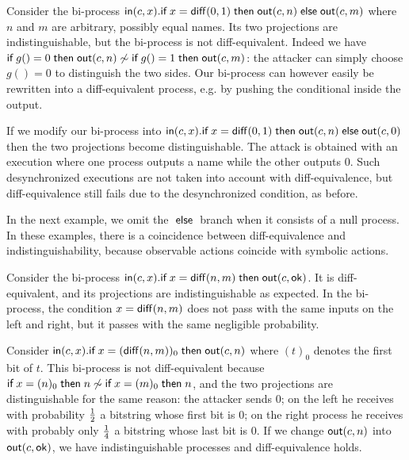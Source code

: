 \begin{example}
  Consider the bi-process
  $\mathsf{in}(c,x).\textsf{if}\; x=\mathsf{diff}(0,1) \;\textsf{then}\; \mathsf{out}(c,n) \;\textsf{else}\; \mathsf{out}(c,m)$
  where $n$ and $m$ are arbitrary, possibly equal names.
  Its two projections are indistinguishable, but the
  bi-process is not diff-equivalent.
  Indeed we have
  $\textsf{if}\; g()=0 \;\textsf{then}\; \mathsf{out}(c,n) \not\sim
   \textsf{if}\; g()=1 \;\textsf{then}\; \mathsf{out}(c,m)$: the attacker can simply choose
  $g()=0$ to distinguish the two sides.
  Our bi-process can however easily be
  rewritten into a diff-equivalent process, e.g. by pushing the conditional
  inside the output.

  If we modify our bi-process into
  $\mathsf{in}(c,x).\textsf{if}\; x=\mathsf{diff}(0,1) \;\textsf{then}\; \mathsf{out}(c,n) \;\textsf{else}\; \mathsf{out}(c,0)$
  then the two projections become distinguishable.
  The attack is obtained with an execution
  where one process outputs a name while the other outputs $0$. Such
  desynchronized executions are not taken into account with diff-equivalence,
  but diff-equivalence still fails due to the desynchronized condition,
  as before.
\end{example}

In the next example, we omit the $\;\textsf{else}\;$ branch when it consists of a null
process. In these examples, there is a coincidence between diff-equivalence
and indistinguishability, because observable actions coincide with symbolic
actions.

\begin{example} \label{ex:negl}
  Consider the bi-process
  $\mathsf{in}(c,x).\textsf{if}\; x=\mathsf{diff}(n,m) \;\textsf{then}\; \mathsf{out}(c,\mathsf{ok})$.
  It is diff-equivalent, and its projections are
  indistinguishable as expected.
  In the bi-process, the condition $x=\mathsf{diff}(n,m)$ does not pass
  with the same inputs on the left and right, but it passes with
  the same negligible probability.
\end{example}

\begin{example} \label{ex:sync}
  Consider
  $\mathsf{in}(c,x).\textsf{if}\; x=(\mathsf{diff}(n,m))_0 \;\textsf{then}\; \mathsf{out}(c,n)$
  where $(t)_0$ denotes the first bit of $t$.
  This bi-process is not diff-equivalent because
  $\textsf{if}\; x=(n)_0 \;\textsf{then}\; n \not\sim \textsf{if}\; x=(m)_0 \;\textsf{then}\; n$, and
  the two projections are distinguishable for the same
  reason: the attacker sends $0$;
  on the left he receives with probability $1\over 2$ a bitstring whose
  first bit is $0$;
  on the right process he receives with probably only $1\over 4$
  a bitstring whose last bit is $0$.
  If we change $\mathsf{out}(c,n)$ into $\mathsf{out}(c,\mathsf{ok})$,
  we have indistinguishable processes and diff-equivalence holds.
\end{example}

